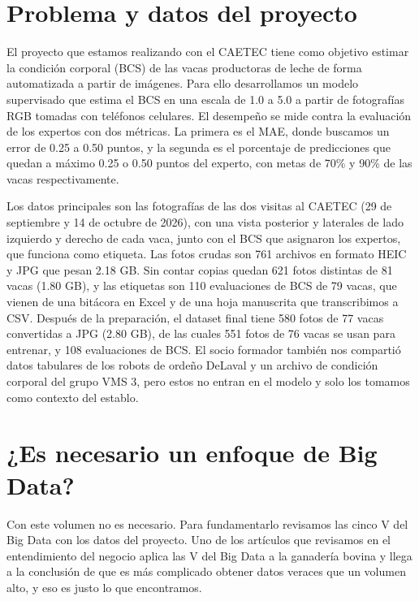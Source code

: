 \documentclass[11pt,letterpaper,DIV=12]{scrartcl}
\begin{document}


\section{Problema y datos del proyecto}

El proyecto que estamos realizando con el CAETEC tiene como objetivo estimar la condición corporal (BCS) de las vacas productoras de leche de forma automatizada a partir de imágenes. Para ello desarrollamos un modelo supervisado que estima el BCS en una escala de 1.0 a 5.0 a partir de fotografías RGB tomadas con teléfonos celulares. El desempeño se mide contra la evaluación de los expertos con dos métricas. La primera es el MAE, donde buscamos un error de 0.25 a 0.50 puntos, y la segunda es el porcentaje de predicciones que quedan a máximo 0.25 o 0.50 puntos del experto, con metas de 70\% y 90\% de las vacas respectivamente.

Los datos principales son las fotografías de las dos visitas al CAETEC (29 de septiembre y 14 de octubre de 2026), con una vista posterior y laterales de lado izquierdo y derecho de cada vaca, junto con el BCS que asignaron los expertos, que funciona como etiqueta. Las fotos crudas son 761 archivos en formato HEIC y JPG que pesan 2.18 GB. Sin contar copias quedan 621 fotos distintas de 81 vacas (1.80 GB), y las etiquetas son 110 evaluaciones de BCS de 79 vacas, que vienen de una bitácora en Excel y de una hoja manuscrita que transcribimos a CSV. Después de la preparación, el dataset final tiene 580 fotos de 77 vacas convertidas a JPG (2.80 GB), de las cuales 551 fotos de 76 vacas se usan para entrenar, y 108 evaluaciones de BCS. El socio formador también nos compartió datos tabulares de los robots de ordeño DeLaval y un archivo de condición corporal del grupo VMS 3, pero estos no entran en el modelo y solo los tomamos como contexto del establo.

\section{¿Es necesario un enfoque de Big Data?}

Con este volumen no es necesario. Para fundamentarlo revisamos las cinco V del Big Data con los datos del proyecto. Uno de los artículos que revisamos en el entendimiento del negocio aplica las V del Big Data a la ganadería bovina y llega a la conclusión de que es más complicado obtener datos veraces que un volumen alto, y eso es justo lo que encontramos.
\end{document}

